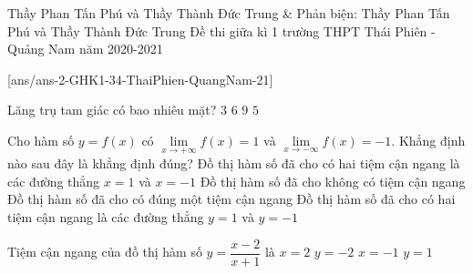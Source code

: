 \begin{name}
	{Thầy Phan Tấn Phú và Thầy Thành Đức Trung \& Phản biện: Thầy Phan Tấn Phú và Thầy Thành Đức Trung}
	{Đề thi giữa kì 1 trường THPT Thái Phiên - Quảng Nam năm 2020-2021}
\end{name}

[ans/ans-2-GHK1-34-ThaiPhien-QuangNam-21]

\begin{ex}%
	Lăng trụ tam giác có bao nhiêu mặt? 
	\choice
	{$3$}
	{$6$}
	{$9$}
	{\True $5$}
\end{ex}
\begin{ex}%
	Cho hàm số $y=f(x)$ có $\lim\limits_{x \to  + \infty } f(x) = 1$ và $\lim\limits_{x \to  -\infty } f(x) = -1$. Khẳng định nào sau đây là khẳng định đúng?
	\choice
	{Đồ thị hàm số đã cho có hai tiệm cận ngang là các đường thẳng $x=1$ và $x=-1$}
	{Đồ thị hàm số đã cho không có tiệm cận ngang}
	{Đồ thị hàm số đã cho có đúng một tiệm cận ngang}
	{\True Đồ thị hàm số đã cho có hai tiệm cận ngang là các đường thẳng $y=1$ và $y=-1$}
\end{ex}
\begin{ex}%
Tiệm cận ngang của đồ thị hàm số $y=\dfrac{x-2}{x+1}$ là
\choice
{$x=2$}
{$y=-2$}
{$x=-1$}
{\True $y=1$}
\end{ex}

